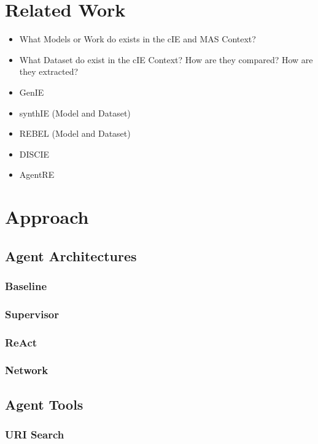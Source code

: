\documentclass[a4paper,oneside,bibliography=totoc]{scrbook}
\begin{document}
\chapter{Related Work}
\label{ch:related_work_chapter}
\begin{itemize}
  \item What Models or Work do exists in the cIE and MAS Context?
  \item What Dataset do exist in the cIE Context? How are they compared? How are they extracted?
  \item GenIE \cite{Josifoski2021}
  \item synthIE (Model and Dataset) \cite{Josifoski2023}
  \item REBEL (Model and Dataset) \cite{HuguetCabot2021}
  \item DISCIE \cite{Moeller2024}
  \item AgentRE \cite{Shi2024}
\end{itemize}


\chapter{Approach}
\label{ch:approach}
\section{Agent Architectures}
\label{sec:agent_architectures}
\subsection{Baseline}
\label{subsec:baseline}
\subsection{Supervisor}
\label{subsec:supervisor}
\subsection{ReAct}
\label{subsec:react}
\subsection{Network}
\label{subsec:network}

\section{Agent Tools}
\label{sec:agent_tools}
\subsection{URI Search}
\label{subsec:uri_search}
\end{document}
